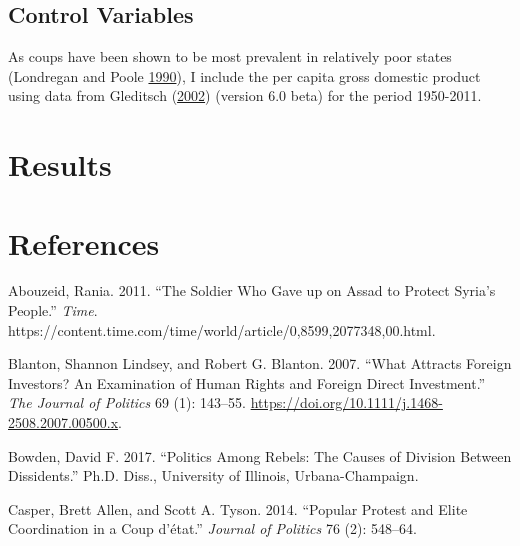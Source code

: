 \documentclass[12pt,]{article}
\theoremstyle{definition}
\theoremstyle{definition}
\theoremstyle{definition}
\theoremstyle{remark}
\begin{document}
\hypertarget{control-variables}{%
\subsection{Control Variables}\label{control-variables}}

As coups have been shown to be most prevalent in relatively poor states
(Londregan and Poole \protect\hyperlink{ref-Londregan1990}{1990}), I
include the per capita gross domestic product using data from Gleditsch
(\protect\hyperlink{ref-Gleditsch2002a}{2002}) (version 6.0 beta) for
the period 1950-2011.

\hypertarget{results}{%
\section{Results}\label{results}}

\singlespacing



\doublespacing

\hypertarget{references}{%
\section*{References}\label{references}}


\indent

\setlength{\parindent}{-0.2in}
\setlength{\leftskip}{0.2in}
\setlength{\parskip}{8pt}

\singlespacing

\hypertarget{refs}{}
\leavevmode\hypertarget{ref-Abouzeid2011}{}%
Abouzeid, Rania. 2011. ``The Soldier Who Gave up on Assad to Protect
Syria's People.'' \emph{Time}.
https://content.time.com/time/world/article/0,8599,2077348,00.html.

\leavevmode\hypertarget{ref-Blanton2007}{}%
Blanton, Shannon Lindsey, and Robert G. Blanton. 2007. ``What Attracts
Foreign Investors? An Examination of Human Rights and Foreign Direct
Investment.'' \emph{The Journal of Politics} 69 (1): 143--55.
\url{https://doi.org/10.1111/j.1468-2508.2007.00500.x}.

\leavevmode\hypertarget{ref-Bowden2017}{}%
Bowden, David F. 2017. ``Politics Among Rebels: The Causes of Division
Between Dissidents.'' Ph.D. Diss., University of Illinois,
Urbana-Champaign.

\leavevmode\hypertarget{ref-Casper2014}{}%
Casper, Brett Allen, and Scott A. Tyson. 2014. ``Popular Protest and
Elite Coordination in a Coup d'état.'' \emph{Journal of Politics} 76
(2): 548--64.
\end{document}
